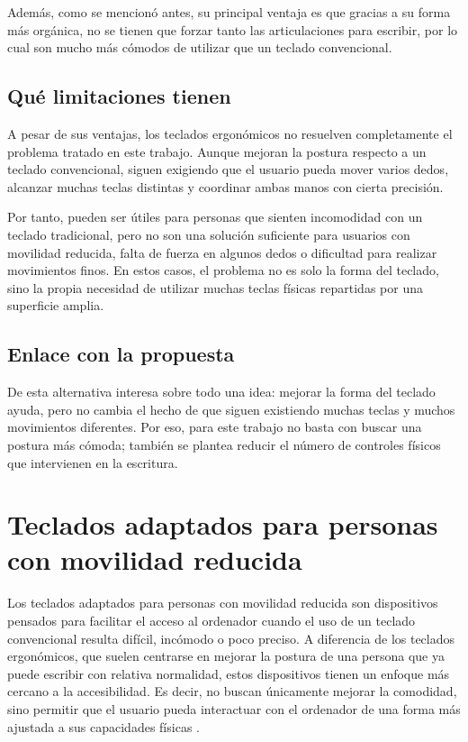 Además, como se mencionó antes, su principal ventaja es que gracias a su forma más orgánica, no se tienen que forzar tanto las articulaciones para escribir, por lo cual son mucho más cómodos de utilizar que un teclado convencional.
\subsection{Qué limitaciones tienen}

A pesar de sus ventajas, los teclados ergonómicos no resuelven completamente el problema tratado en este trabajo. Aunque mejoran la postura respecto a un teclado convencional, siguen exigiendo que el usuario pueda mover varios dedos, alcanzar muchas teclas distintas y coordinar ambas manos con cierta precisión.

Por tanto, pueden ser útiles para personas que sienten incomodidad con un teclado tradicional, pero no son una solución suficiente para usuarios con movilidad reducida, falta de fuerza en algunos dedos o dificultad para realizar movimientos finos. En estos casos, el problema no es solo la forma del teclado, sino la propia necesidad de utilizar muchas teclas físicas repartidas por una superficie amplia.

\subsection{Enlace con la propuesta}

De esta alternativa interesa sobre todo una idea: mejorar la forma del teclado ayuda, pero no cambia el hecho de que siguen existiendo muchas teclas y muchos movimientos diferentes. Por eso, para este trabajo no basta con buscar una postura más cómoda; también se plantea reducir el número de controles físicos que intervienen en la escritura.



\section{Teclados adaptados para personas con movilidad reducida}
\label{sec:teclados-adaptados}

Los teclados adaptados para personas con movilidad reducida son dispositivos pensados para facilitar el acceso al ordenador cuando el uso de un teclado convencional resulta difícil, incómodo o poco preciso. A diferencia de los teclados ergonómicos, que suelen centrarse en mejorar la postura de una persona que ya puede escribir con relativa normalidad, estos dispositivos tienen un enfoque más cercano a la accesibilidad. Es decir, no buscan únicamente mejorar la comodidad, sino permitir que el usuario pueda interactuar con el ordenador de una forma más ajustada a sus capacidades físicas \cite{whoAssistiveTechnology}.

